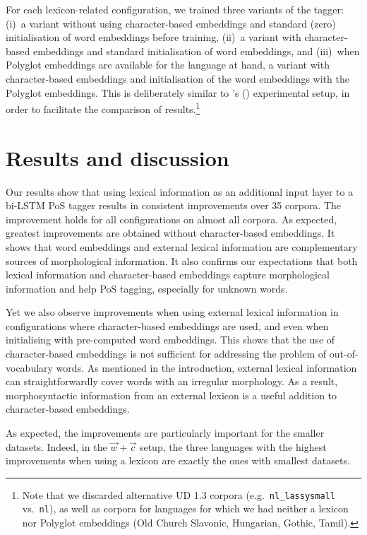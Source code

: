\documentclass[11pt,letterpaper]{article}
\begin{document}
For each lexicon-related configuration, we trained three variants of the tagger: (i)~a variant without using
character-based embeddings and standard (zero) initialisation of word embeddings before training, (ii)~a variant with
character-based embeddings and standard initialisation of word embeddings, and (iii)~when Polyglot embeddings are
available for the language at hand, a variant with character-based embeddings and initialisation of the word embeddings
with the Polyglot embeddings. This is deliberately similar to \citeauthor{plank16}'s (\citeyear{plank16}) experimental
setup, in order to facilitate the comparison of results.\footnote{Note that we discarded alternative UD 1.3 corpora
  (e.g.~{\tt nl\_lassysmall} vs.~{\tt nl}), as well as corpora for languages for which we had neither a
  lexicon nor Polyglot embeddings (Old Church Slavonic, Hungarian, Gothic, Tamil).}


\section{Results and discussion}

Our results show that using lexical information as an additional input layer to a bi-LSTM PoS tagger results in
consistent improvements over 35 corpora. The improvement holds for all configurations on almost all corpora. As
expected, greatest improvements are obtained without character-based embeddings. It shows that word embeddings and external
lexical information are complementary sources of morphological information. It also confirms our expectations that both
lexical information and character-based embeddings capture morphological information and help PoS tagging, especially for
unknown words.

Yet we also observe improvements when using external lexical information in configurations where character-based
embeddings are used, and even when initialising with pre-computed word embeddings. This shows that the use of
character-based embeddings is not sufficient for addressing the problem of out-of-vocabulary words. As mentioned in the
introduction, external lexical information can straightforwardly cover words with an irregular morphology. As a result,
morphosyntactic information from an external lexicon is a useful addition to character-based embeddings.

As expected, the improvements are particularly important for the smaller datasets. Indeed, in the $\vec{w}+\vec{c}$
setup, the three languages with the highest improvements when using a lexicon are exactly the ones with smallest
datasets.
\end{document}
